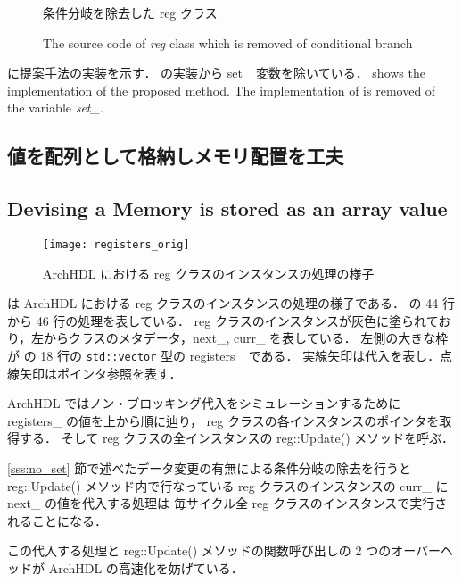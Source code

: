 \begin{figure}[tb]
 
 \caption{条件分岐を除去した reg クラス}
\fi
 \caption{The source code of \textit{reg} class which is removed of conditional branch}
 \label{src:reg_no_set}
\end{figure}

 に提案手法の実装を示す．
 の実装から set\_ 変数を除いている．
\fi
{} shows the implementation of the proposed method.
The implementation of  is removed of the variable \textit{set\_}.



\subsection{値を配列として格納しメモリ配置を工夫} \label{sss:mem_copy}
\fi
\subsection{Devising a Memory is stored as an array value}

\begin{figure}[t]
 \centering
 \texttt{[image: registers\_orig]}
 \caption{ArchHDL における reg クラスのインスタンスの処理の様子}
 \label{fig:regs}
\end{figure}

 は ArchHDL における reg クラスのインスタンスの処理の様子である．
 の 44 行から 46 行の処理を表している．
reg クラスのインスタンスが灰色に塗られており，左からクラスのメタデータ，next\_, curr\_ を表している．
左側の大きな枠が の 18 行の \verb`std::vector` 型の registers\_ である．
実線矢印は代入を表し．点線矢印はポインタ参照を表す．

ArchHDL ではノン・ブロッキング代入をシミュレーションするために registers\_ の値を上から順に辿り，
reg クラスの各インスタンスのポインタを取得する．
そして reg クラスの全インスタンスの reg::Update() メソッドを呼ぶ．

\ref{sss:no_set} 節で述べたデータ変更の有無による条件分岐の除去を行うと reg::Update() メソッド内で行なっている
reg クラスのインスタンスの curr\_ に next\_ の値を代入する処理は
毎サイクル全 reg クラスのインスタンスで実行されることになる．

この代入する処理と reg::Update() メソッドの関数呼び出しの 2 つのオーバーヘッドが ArchHDL の高速化を妨げている．

